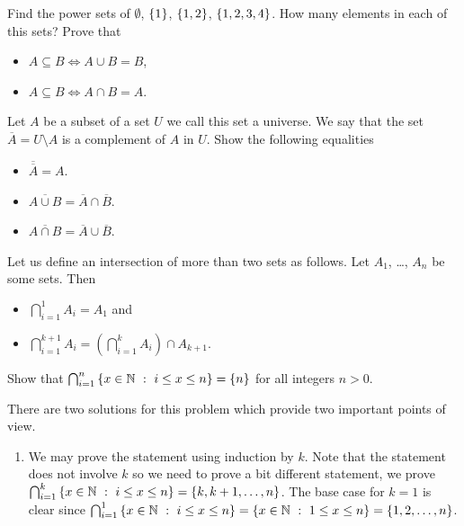 \begin{chapterendexercises}
  \exercise Find the power sets of $\emptyset$, $\set{1}$, $\set{1, 2}$,
    $\set{1, 2, 3, 4}$. How many elements in each of this sets?
  \exercise[recommended] Prove that
    \begin{itemize}
      \item $A \subseteq B \iff A \cup B = B$,
      \item $A \subseteq B \iff A \cap B = A$.
    \end{itemize}
  \exercise Let $A$ be a subset of a set $U$ we call this set a universe.
    We say that the set $\overline{A} = U \setminus A$ is a complement of $A$
    in $U$. Show the following equalities
    \begin{itemize}
      \item $\overline{\overline{A}} = A$.
      \item $\overline{A \cup B} = \overline{A} \cap \overline{B}$.
      \item $\overline{A \cap B} = \overline{A} \cup \overline{B}$.
    \end{itemize}
  \exercise[recommended] Let us define an intersection of more than two sets as follows.
    Let $A_1$, \dots, $A_n$ be some sets. Then
    \begin{itemize}
      \item $\bigcap_{i = 1}^1 A_i = A_1$ and
      \item $\bigcap_{i = 1}^{k + 1} A_i = \left( \bigcap_{i = 1}^k A_i \right)
        \cap A_{k + 1}$.
    \end{itemize}

    Show that $\bigcap_{i = 1}^n \set[i \le x \le n]{x \in \N} =
    \set{n}$ for all integers $n > 0$.
    \begin{solution}
      There are two solutions for this problem which provide two important
      points of view.

      \begin{enumerate}
        \item We may prove the statement using induction by $k$. Note that the
          statement does not involve $k$ so we need to prove a bit different
          statement, we prove 
          $\bigcap_{i = 1}^k \set[i \le x \le n]{x \in \N} =
            \set{k, k + 1, \dots, n}$.
          The base case for $k = 1$ is clear since 
          $\bigcap_{i = 1}^1 \set[i \le x \le n]{x \in \N} =
            \set[1 \le x \le n]{x \in \N} = \set{1, 2, \dots, n}$.


\end{enumerate}
\end{solution}
\end{chapterendexercises}
